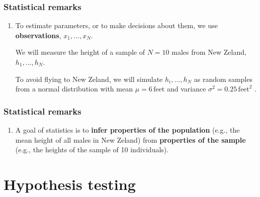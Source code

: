 \documentclass{beamer}
\newcounter{saveenumi}
\newcommand{\seti}{\setcounter{saveenumi}{\value{enumi}}}
\newcommand{\conti}{\setcounter{enumi}{\value{saveenumi}}}
\begin{document}
\begin{frame}
\frametitle{Statistical remarks}

    \begin{enumerate}[<+->]

        \conti

        \item To estimate parameters, or to make decisions about them, we use
            \textbf{observations}, $x_1,\ldots,x_N$.

            \begin{example}

                We will measure the height of a sample of $N=10$ males from New
                Zeland, $h_1,\ldots,h_N$.

                To avoid flying to New Zeland, we will simulate
                $h_i,\ldots,h_N$ as random samples from a normal distribution
                with mean $\mu=6\,\text{feet}$ and variance
                $\sigma^2=0.25\,\text{feet}^2$ .

            \end{example}

            \seti

    \end{enumerate}

\end{frame}

\begin{frame}
\frametitle{Statistical remarks}

    \begin{enumerate}

        \conti

        \item A goal of statistics is to \textbf{infer properties of the
            population} (e.g., the mean height of all males in New Zeland) from
            \textbf{properties of the sample} (e.g., the heights of the sample
            of 10 individuals).

    \end{enumerate}

\end{frame}

\section{Hypothesis testing}
\end{document}
